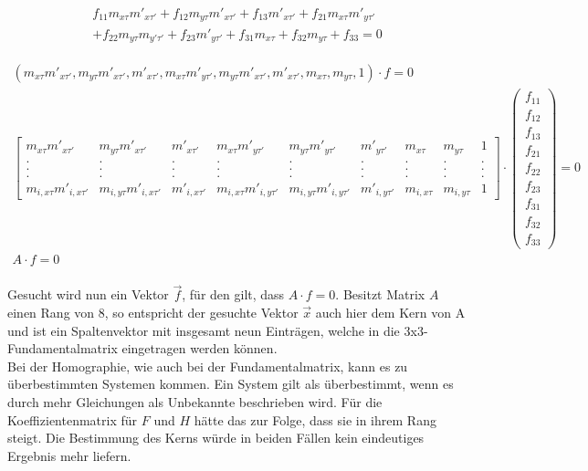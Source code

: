\begin{gather}
\begin{split}
	f_{11}m_{x\tau}m'_{x\tau'}+f_{12}m_{y\tau}m'_{x\tau'}+f_{13}m'_{x\tau'}+f_{21}m_{x\tau}m'_{y\tau'}\\
	+f_{22}m_{y\tau}m_{y'\tau'}+f_{23}m'_{y\tau'}+f_{31}m_{x\tau}+f_{32}m_{y\tau}+f_{33} =0
\end{split} \label{eq:F}
\end{gather}

\begin{gather*}
	(m_{x\tau}m'_{x\tau'},m_{y\tau}m'_{x\tau'},m'_{x\tau'},m_{x\tau}m'_{y\tau'},m_{y\tau}m'_{x\tau'},m'_{x\tau'},m_{x\tau},m_{y\tau},1)\cdot f =0\\
	\begin{bmatrix}
		m_{x\tau}m'_{x\tau'}&m_{y\tau}m'_{x\tau'}&m'_{x\tau'}&m_{x\tau}m'_{y\tau'}&m_{y\tau}m'_{y\tau'}&m'_{y\tau'}&m_{x\tau}&m_{y\tau}&1\\
		.&.&.&.&.&.&.&.&.\\
		.&.&.&.&.&.&.&.&.\\
		.&.&.&.&.&.&.&.&.\\
		m_{i,x\tau}m'_{i,x\tau'}&m_{i,y\tau}m'_{i,x\tau'}&m'_{i,x\tau'}&m_{i,x\tau}m'_{i,y\tau'}&m_{i,y\tau}m'_{i,y\tau'}&m'_{i,y\tau'}&m_{i,x\tau}&m_{i,y\tau}&1
	\end{bmatrix}
	\cdot 
	\begin{pmatrix}
		f_{11}\\f_{12}\\f_{13}\\f_{21}\\f_{22}\\f_{23}\\f_{31}\\f_{32}\\f_{33}
	\end{pmatrix}
	= 0\\
	A\cdot f = 0
\end{gather*}\\


Gesucht wird nun ein Vektor $\vec{f}$, für den gilt, dass $A \cdot f = 0$. Besitzt Matrix $A$ einen Rang von 8, so entspricht der gesuchte Vektor $\vec{x}$ auch hier dem Kern von A und ist ein Spaltenvektor mit insgesamt neun Einträgen, welche in die 3x3-Fundamentalmatrix eingetragen werden können\cite{HZ,ZZGXr}.\\


Bei der Homographie, wie auch bei der Fundamentalmatrix, kann es zu überbestimmten Systemen kommen. Ein System gilt als überbestimmt, wenn es durch mehr Gleichungen als Unbekannte beschrieben wird\cite{Schwarz,Scholz}. Für die Koeffizientenmatrix für $F$ und $H$ hätte das zur Folge, dass sie in ihrem Rang steigt. Die Bestimmung des Kerns würde in beiden Fällen kein eindeutiges Ergebnis mehr liefern\cite{HZ,Schwarz}.\\


